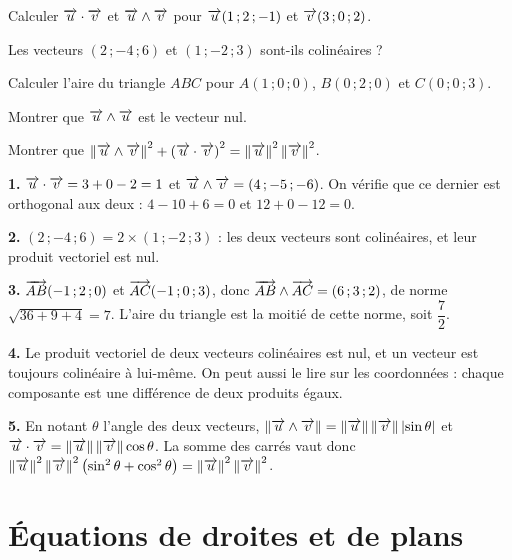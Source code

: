 \begin{entrainement}
\exo[\niveau{1}] Calculer $\overrightarrow{u} \cdot \overrightarrow{v}$ et $\overrightarrow{u} \wedge \overrightarrow{v}$ pour
$\overrightarrow{u}(1\,;2\,;-1)$ et $\overrightarrow{v}(3\,;0\,;2)$.

\exo[\niveau{1}] Les vecteurs $(2\,;-4\,;6)$ et $(1\,;-2\,;3)$ sont-ils
colinéaires ?

\exo[\niveau{2}] Calculer l'aire du triangle $ABC$ pour $A(1\,;0\,;0)$,
$B(0\,;2\,;0)$ et $C(0\,;0\,;3)$.

\exo[\niveau{2}] Montrer que $\overrightarrow{u} \wedge \overrightarrow{u}$ est le vecteur nul.

\exo[\niveau{3}] Montrer que $\left\lVert \overrightarrow{u} \wedge \overrightarrow{v} \right\rVert^{2}
+\left(\overrightarrow{u} \cdot \overrightarrow{v}\right)^{2}
= \left\lVert \overrightarrow{u} \right\rVert^{2}\left\lVert \overrightarrow{v} \right\rVert^{2}$.
\end{entrainement}

\begin{corrige}
\textbf{1.} $\overrightarrow{u} \cdot \overrightarrow{v} = 3+0-2 = 1$ et
$\overrightarrow{u} \wedge \overrightarrow{v} = \left(4\,;-5\,;-6\right)$. On vérifie que ce dernier
est orthogonal aux deux : $4-10+6 = 0$ et $12+0-12 = 0$.

\textbf{2.} $(2\,;-4\,;6) = 2\times(1\,;-2\,;3)$ : les deux vecteurs sont
colinéaires, et leur produit vectoriel est nul.

\textbf{3.} $\overrightarrow{AB}(-1\,;2\,;0)$ et $\overrightarrow{AC}(-1\,;0\,;3)$, donc
$\overrightarrow{AB} \wedge \overrightarrow{AC} = (6\,;3\,;2)$, de norme
$\sqrt{36+9+4} = 7$. L'aire du triangle est la moitié de cette norme, soit
$\dfrac72$.

\textbf{4.} Le produit vectoriel de deux vecteurs colinéaires est nul, et un
vecteur est toujours colinéaire à lui-même. On peut aussi le lire sur les
coordonnées : chaque composante est une différence de deux produits égaux.

\textbf{5.} En notant $\theta$ l'angle des deux vecteurs,
$\left\lVert \overrightarrow{u} \wedge \overrightarrow{v} \right\rVert = \left\lVert \overrightarrow{u} \right\rVert\left\lVert \overrightarrow{v} \right\rVert\left|\sin\theta\right|$ et
$\overrightarrow{u} \cdot \overrightarrow{v} = \left\lVert \overrightarrow{u} \right\rVert\left\lVert \overrightarrow{v} \right\rVert\cos\theta$. La somme des
carrés vaut donc
$\left\lVert \overrightarrow{u} \right\rVert^{2}\left\lVert \overrightarrow{v} \right\rVert^{2}\left(\sin^{2}\theta+\cos^{2}\theta\right)
= \left\lVert \overrightarrow{u} \right\rVert^{2}\left\lVert \overrightarrow{v} \right\rVert^{2}$.
\end{corrige}

\section{Équations de droites et de plans}

